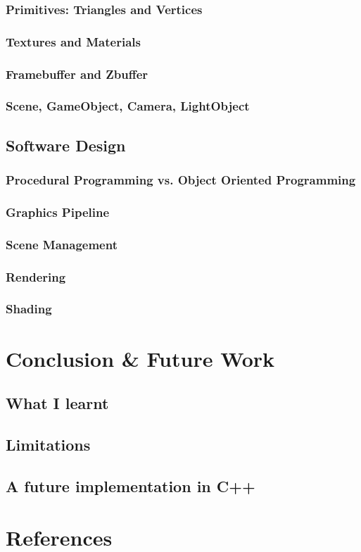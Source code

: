 \documentclass{article}
\begin{document}
\subsubsection{Primitives: Triangles and Vertices}
\subsubsection{Textures and Materials}
\subsubsection{Framebuffer and Zbuffer}
\subsubsection{Scene, GameObject, Camera, LightObject}

\subsection{Software Design}
\subsubsection{Procedural Programming vs. Object Oriented Programming}
\subsubsection{Graphics Pipeline}
\subsubsection{Scene Management}
\subsubsection{Rendering}
\subsubsection{Shading}

\section{Conclusion \& Future Work}

\subsection{What I learnt}

\subsection{Limitations}

\subsection{A future implementation in C++}


\section{References}
\end{document}
